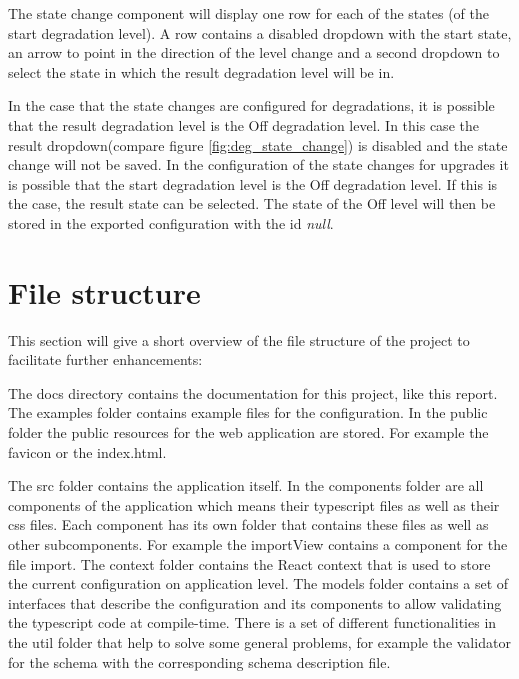 \noindent The state change component will display one row for each of the states (of the start degradation level). A row contains a disabled dropdown with the start state, an arrow to point in the direction of the level change and a second dropdown to select the state in which the result degradation level will be in.

In the case that the state changes are configured for degradations, it is possible that the result degradation level is the Off degradation level. In this case the result dropdown(compare figure \ref{fig:deg_state_change}) is disabled and the state change will not be saved. In the configuration of the state changes for upgrades it is possible that the start degradation level is the Off degradation level. If this is the case, the result state can be selected. The state of the Off level will then be stored in the exported configuration with the id \textit{null}. 

\newpage

\section{File structure}
This section will give a short overview of the file structure of the project to facilitate further enhancements:

\hfill

The docs directory contains the documentation for this project, like this report. The examples folder contains example files for the configuration. In the public folder the public resources for the web application are stored. For example the favicon or the index.html.

The src folder contains the application itself. In the components folder are all components of the application which means their typescript files as well as their css files. Each component has its own folder that contains these files as well as other subcomponents. For example the importView contains a component for the file import. The context folder contains the React context that is used to store the current configuration on application level. The models folder contains a set of interfaces that describe the configuration and its components to allow validating the typescript code at compile-time. There is a set of different functionalities in the util folder that help to solve some general problems, for example the validator for the schema with the corresponding schema description file.